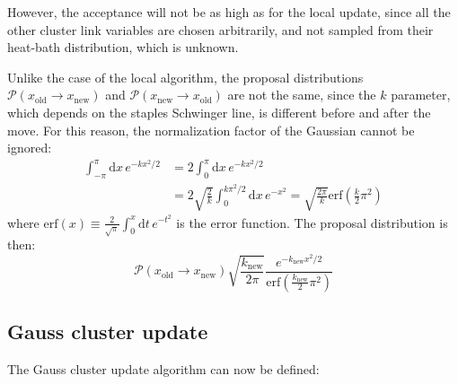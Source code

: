 However, the acceptance will not be as high as for the local update,
since all the other cluster link variables are chosen arbitrarily,
and not sampled from their heat-bath distribution, which is unknown.

Unlike the case of the local algorithm,
the proposal distributions $\mathcal P(x_\mathrm{old}\to x_\mathrm{new})$ and $\mathcal P(x_\mathrm{new}\to x_\mathrm{old})$
are not the same, since the $k$ parameter,
which depends on the staples Schwinger line, is different before and after the move.
For this reason, the normalization factor of the Gaussian cannot be ignored:
\[\begin{aligned}
    \int_{-\pi}^\pi\mathrm dx\,e^{-kx^2/2} &= 2\int_0^\pi\mathrm dx\,e^{-kx^2/2} \\
                                           &= 2\sqrt{\frac{2}{k}}\int_0^{k\pi^2/2}\mathrm dx\,e^{-x^2} = \sqrt{\frac{2\pi}{k}}\mathrm{erf}\left(\frac{k}{2}\pi^2\right)
\end{aligned}\]
where $\mathrm{erf}(x) \equiv \frac{2}{\sqrt\pi}\int_0^x\mathrm dt\,e^{-t^2}$ is the error function.
The proposal distribution is then:
\begin{equation}\label{eq:gauss_cluster_proposal}
    \mathcal P(x_\mathrm{old}\to x_\mathrm{new})\sqrt{\frac{k_\mathrm{new}}{2\pi}}\frac{e^{-k_\mathrm{new}x^2/2}}{\mathrm{erf}\left(\frac{k_\mathrm{new}}{2}\pi^2\right)}
\end{equation}

\subsection*{Gauss cluster update}

The Gauss cluster update algorithm can now be defined:

